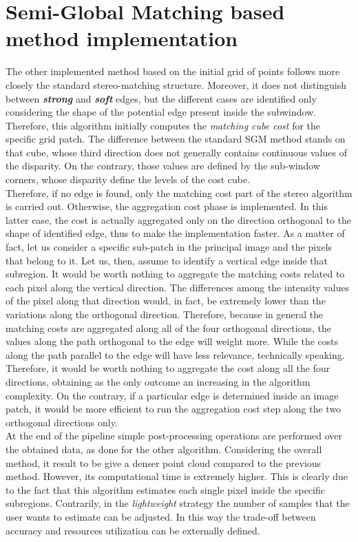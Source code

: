 \section{Semi-Global Matching based method implementation}
\label{section:sgm-based}

The other implemented method based on the initial grid of points follows more closely the standard stereo-matching structure.
Moreover, it does not distinguish between \textbf{\textit{strong}} and \textbf{\textit{soft}} edges, but the different cases are identified only considering the shape of the potential edge present inside the subwindow. \\
Therefore, this algorithm initially computes the \textit{matching cube cost} for the specific grid patch. 
The difference between the standard SGM method stands on that cube, whose third direction does not generally contains continuous values of the disparity.
On the contrary, those values are defined by the sub-window corners, whose disparity define the levels of the cost cube.\\
Therefore, if no edge is found, only the matching cost part of the stereo algorithm is carried out.
Otherwise, the aggregation cost phase is implemented.
In this latter case, the cost is actually aggregated only on the direction orthogonal to the shape of identified edge, thus to make the implementation faster.
As a matter of fact, let us consider a specific sub-patch in the principal image and the pixels that belong to it.
Let us, then, assume to identify a vertical edge inside that subregion.
It would be worth nothing to aggregate the matching costs related to each pixel along the vertical direction.
The differences among the intensity values of the pixel along that direction would, in fact, be extremely lower than the variations along the orthogonal direction.
Therefore, because in general the matching costs are aggregated along all of the four orthogonal directions, the values along the path orthogonal to the edge will weight more.
While the costs along the path parallel to the edge will have less relevance, technically speaking.
Therefore, it would be worth nothing to aggregate the cost along all the four directions, obtaining as the only outcome an increasing in the algorithm complexity.
On the contrary, if a particular edge is determined inside an image patch, it would be more efficient to run the aggregation cost step along the two orthogonal directions only.\\
At the end of the pipeline simple post-processing operations are performed over the obtained data, as done for the other algorithm.
Considering the overall method, it result to be give a denser point cloud compared to the previous method. 
However, its computational time is extremely higher.
This is clearly due to the fact that this algorithm estimates each single pixel inside the specific subregions.
Contrarily, in the \textit{lightweight} strategy the number of samples that the user wants to estimate can be adjusted. 
In this way the trade-off between accuracy and resources utilization can be externally defined. 

